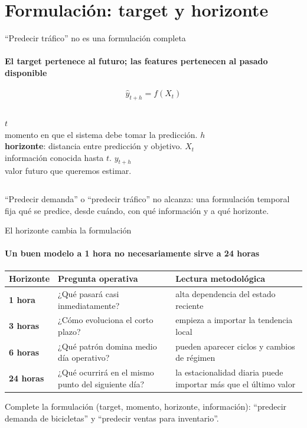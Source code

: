 \documentclass[aspectratio=169,11pt]{beamer}  %
\newcommand{\hrow}{\rowcolor{mlcream}}
\begin{document}
\section{Formulación: target y horizonte}

\begin{frame}{``Predecir tráfico'' no es una formulación completa}
\framesubtitle{El target pertenece al futuro; las features pertenecen al pasado disponible}
{\Large\[ \hat y_{t+h} = f(X_t) \]}
\begin{columns}[T]
 \small $t$\\ momento en que el sistema debe tomar la predicción.
 \small $h$\\ \textbf{horizonte}: distancia entre predicción y objetivo.
 \small $X_t$\\ información conocida hasta $t$.
 \small $y_{t+h}$\\ valor futuro que queremos estimar.
\end{columns}
\vspace{6pt}
\begin{rulebox}
\small ``Predecir demanda'' o ``predecir tráfico'' no alcanza: una formulación temporal fija qué se predice, desde cuándo, con qué información y a qué horizonte.
\end{rulebox}
\end{frame}

\begin{frame}{El horizonte cambia la formulación}
\framesubtitle{Un buen modelo a 1 hora no necesariamente sirve a 24 horas}
\centering\small
\begin{tabular}{@{}l P{0.39\textwidth} P{0.41\textwidth}@{}}
\toprule
\hrow \textbf{Horizonte} & Pregunta operativa & Lectura metodológica\\
\midrule
\textbf{1 hora} & ¿Qué pasará casi inmediatamente? & alta dependencia del estado reciente\\
\textbf{3 horas} & ¿Cómo evoluciona el corto plazo? & empieza a importar la tendencia local\\
\textbf{6 horas} & ¿Qué patrón domina medio día operativo? & pueden aparecer ciclos y cambios de régimen\\
\textbf{24 horas} & ¿Qué ocurrirá en el mismo punto del siguiente día? & la estacionalidad diaria puede importar más que el último valor\\
\bottomrule
\end{tabular}
\raggedright
\begin{taskbox}[Práctica]
\small Complete la formulación (target, momento, horizonte, información): ``predecir demanda de bicicletas'' y ``predecir ventas para inventario''.
\end{taskbox}
\end{frame}
\end{document}
